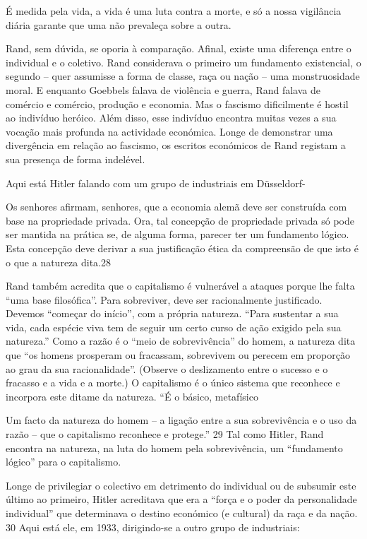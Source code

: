  \par 
É medida pela vida, a vida é uma luta contra a morte, e só a nossa vigilância diária garante que uma não prevaleça sobre a outra.
 \par 
Rand, sem dúvida, se oporia à comparação. Afinal, existe uma diferença entre o individual e o coletivo. Rand considerava o primeiro um fundamento existencial, o segundo – quer assumisse a forma de classe, raça ou nação – uma monstruosidade moral. E enquanto Goebbels falava de violência e guerra, Rand falava de comércio e comércio, produção e economia. Mas o fascismo dificilmente é hostil ao indivíduo heróico. Além disso, esse indivíduo encontra muitas vezes a sua vocação mais profunda na actividade económica. Longe de demonstrar uma divergência em relação ao fascismo, os escritos económicos de Rand registam a sua presença de forma indelével.
 \par 
Aqui está Hitler falando com um grupo de industriais em Düsseldorf-
 \par 
Os senhores afirmam, senhores, que a economia alemã deve ser construída com base na propriedade privada. Ora, tal concepção de propriedade privada só pode ser mantida na prática se, de alguma forma, parecer ter um fundamento lógico. Esta concepção deve derivar a sua justificação ética da compreensão de que isto é o que a natureza dita.{\color{blue}28}
 \par 
Rand também acredita que o capitalismo é vulnerável a ataques porque lhe falta “uma base filosófica”. Para sobreviver, deve ser racionalmente justificado. Devemos “começar do início”, com a própria natureza. “Para sustentar a sua vida, cada espécie viva tem de seguir um certo curso de ação exigido pela sua natureza.” Como a razão é o “meio de sobrevivência” do homem, a natureza dita que “os homens prosperam ou fracassam, sobrevivem ou perecem em proporção ao grau da sua racionalidade”. (Observe o deslizamento entre o sucesso e o fracasso e a vida e a morte.) O capitalismo é o único sistema que reconhece e incorpora este ditame da natureza. “É o básico, metafísico
 \par 
Um facto da natureza do homem – a ligação entre a sua sobrevivência e o uso da razão – que o capitalismo reconhece e protege.” {\color{blue}29} Tal como Hitler, Rand encontra na natureza, na luta do homem pela sobrevivência, um “fundamento lógico” para o capitalismo.
 \par 
Longe de privilegiar o colectivo em detrimento do individual ou de subsumir este último ao primeiro, Hitler acreditava que era a “força e o poder da personalidade individual” que determinava o destino económico (e cultural) da raça e da nação. {\color{blue}30} Aqui está ele, em 1933, dirigindo-se a outro grupo de industriais:
